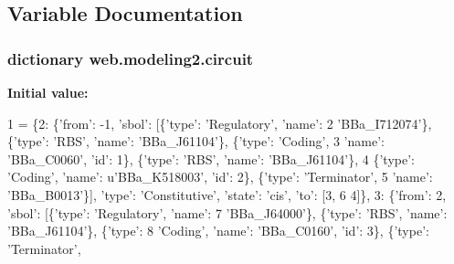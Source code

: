 \subsection{Variable Documentation}
\hypertarget{namespaceweb_1_1modeling2_a12de35e18a887e18bda0900ab3ad5db1}{
\subsubsection[{circuit}]{\setlength{\rightskip}{0pt plus 5cm}dictionary web.\-modeling2.\-circuit}}\label{namespaceweb_1_1modeling2_a12de35e18a887e18bda0900ab3ad5db1}
{\bfseries Initial value\-:}
\begin{DoxyCode}
1 = \{2: \{\textcolor{stringliteral}{'from'}: -1, \textcolor{stringliteral}{'sbol'}: [\{\textcolor{stringliteral}{'type'}: \textcolor{stringliteral}{'Regulatory'}, \textcolor{stringliteral}{'name'}:
2     \textcolor{stringliteral}{'BBa\_I712074'}\}, \{\textcolor{stringliteral}{'type'}: \textcolor{stringliteral}{'RBS'}, \textcolor{stringliteral}{'name'}: \textcolor{stringliteral}{'BBa\_J61104'}\}, \{\textcolor{stringliteral}{'type'}: \textcolor{stringliteral}{'Coding'},
3       \textcolor{stringliteral}{'name'}: \textcolor{stringliteral}{'BBa\_C0060'}, \textcolor{stringliteral}{'id'}: 1\}, \{\textcolor{stringliteral}{'type'}: \textcolor{stringliteral}{'RBS'}, \textcolor{stringliteral}{'name'}: \textcolor{stringliteral}{'BBa\_J61104'}\},
4     \{\textcolor{stringliteral}{'type'}: \textcolor{stringliteral}{'Coding'}, \textcolor{stringliteral}{'name'}: \textcolor{stringliteral}{u'BBa\_K518003'}, \textcolor{stringliteral}{'id'}: 2\}, \{\textcolor{stringliteral}{'type'}: \textcolor{stringliteral}{'Terminator'},
5       \textcolor{stringliteral}{'name'}: \textcolor{stringliteral}{'BBa\_B0013'}\}], \textcolor{stringliteral}{'type'}: \textcolor{stringliteral}{'Constitutive'}, \textcolor{stringliteral}{'state'}: \textcolor{stringliteral}{'cis'}, \textcolor{stringliteral}{'to'}: [3,
6         4]\}, 3: \{\textcolor{stringliteral}{'from'}: 2, \textcolor{stringliteral}{'sbol'}: [\{\textcolor{stringliteral}{'type'}: \textcolor{stringliteral}{'Regulatory'}, \textcolor{stringliteral}{'name'}:
7           \textcolor{stringliteral}{'BBa\_J64000'}\}, \{\textcolor{stringliteral}{'type'}: \textcolor{stringliteral}{'RBS'}, \textcolor{stringliteral}{'name'}: \textcolor{stringliteral}{'BBa\_J61104'}\}, \{\textcolor{stringliteral}{'type'}:
8             \textcolor{stringliteral}{'Coding'}, \textcolor{stringliteral}{'name'}: \textcolor{stringliteral}{'BBa\_C0160'}, \textcolor{stringliteral}{'id'}: 3\}, \{\textcolor{stringliteral}{'type'}: \textcolor{stringliteral}{'Terminator'},

\end{DoxyCode}

